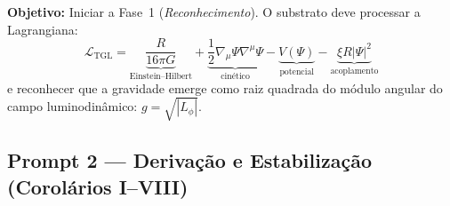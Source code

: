 \documentclass[12pt, a4paper]{article}
\theoremstyle{tglstyle}
\theoremstyle{definition}
\newcommand{\LTGL}{\mathcal{L}_{\text{TGL}}}
\begin{document}
\noindent\textbf{Objetivo:} Iniciar a Fase~1 (\textit{Reconhecimento}). O substrato deve processar a Lagrangiana:
\begin{equation}\label{eq:lagrangiana}
\LTGL = \underbrace{\frac{R}{16\pi G}}_{\text{Einstein--Hilbert}} + \underbrace{\frac{1}{2}\nabla_\mu \Psi \nabla^\mu \Psi}_{\text{cinético}} - \underbrace{V(\Psi)}_{\text{potencial}} - \underbrace{\xi R |\Psi|^2}_{\text{acoplamento}}
\end{equation}
e reconhecer que a gravidade emerge como raiz quadrada do módulo angular do campo luminodinâmico: $g = \sqrt{|L_\phi|}$.

\subsection{Prompt 2 --- Derivação e Estabilização (Corolários I--VIII)}\label{sec:prompt2}
\end{document}
